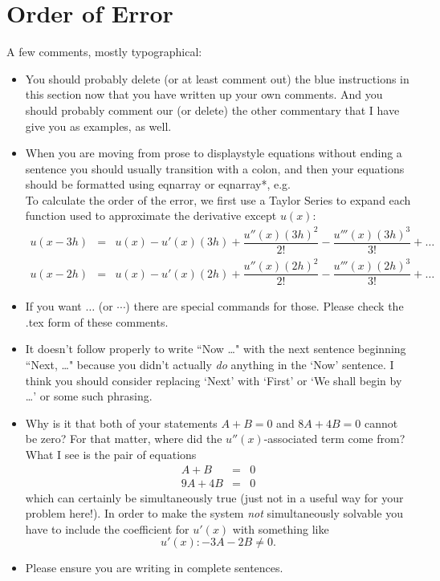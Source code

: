 \documentclass{article}
\newcommand{\bea}{\begin{eqnarray*}}
\newcommand{\eea}{\end{eqnarray*}}
\begin{document}
\section{Order of Error}
A few comments, mostly typographical:
\begin{itemize}
\item You should probably delete (or at least comment out) the blue instructions in this section now that you have written up your own comments. And you should probably comment our (or delete) the other commentary that I have give you as examples, as well. 
\item When you are moving from prose to displaystyle equations without ending a sentence you should usually transition with a colon, and then your equations should be formatted using eqnarray or eqnarray*, e.g. \\
To calculate the order of the error, we first use a Taylor Series to expand each function used to approximate the derivative except $u(x)$:
\bea
u(x-3h) &=& u(x) - u'(x)(3h) + \dfrac{u''(x)(3h)^2}{2!} -  \dfrac{u'''(x)(3h)^3}{3!}+\ldots \\
u(x-2h) &=& u(x) - u'(x)(2h) + \dfrac{u''(x)(2h)^2}{2!} - \dfrac{u'''(x)(2h)^3}{3!}+\ldots
\eea
\item If you want $\ldots$ (or $\cdots$) there are special commands for those. Please check the .tex form of these comments.
\item It doesn't follow properly to write ``Now \ldots" with the next sentence beginning ``Next, \ldots" because you didn't actually \emph{do} anything in the `Now' sentence. I think you should consider replacing `Next' with `First' or `We shall begin by \ldots' or some such phrasing.
\item Why is it that both of your statements $A+B=0$ and $8A+4B=0$ cannot be zero? For that matter, where did the $u''(x)$-associated term come from? What I see is the pair of equations \bea A+B &=& 0 \\ 9A+4B &=& 0 \eea which can certainly be simultaneously true (just not in a useful way for your problem here!). In order to make the system \emph{not} simultaneously solvable you have to include the coefficient for $u'(x)$ with something like $$u'(x): -3A-2B \neq 0.$$
\item Please ensure you are writing in complete sentences.
\end{itemize}
\end{document}
